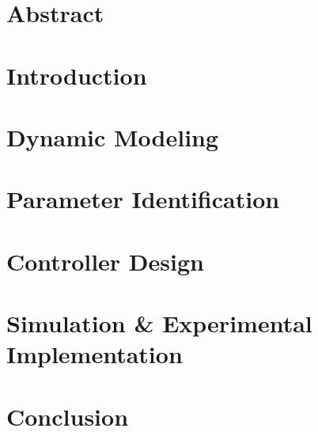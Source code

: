 \documentclass[11pt,twoside]{report}
\begin{document}

\thispagestyle{empty}



\chapter*{Abstract}

\cleardoublepage

\tableofcontents

\cleardoublepage

\cleardoublepage







\chapter{Introduction}

\cleardoublepage

\chapter{Dynamic Modeling}

\cleardoublepage

\chapter{Parameter Identification}

\cleardoublepage


\chapter{Controller Design}

\cleardoublepage


\chapter{Simulation \& Experimental\\ Implementation}

\cleardoublepage

\chapter{Conclusion}

\cleardoublepage
\end{document}
